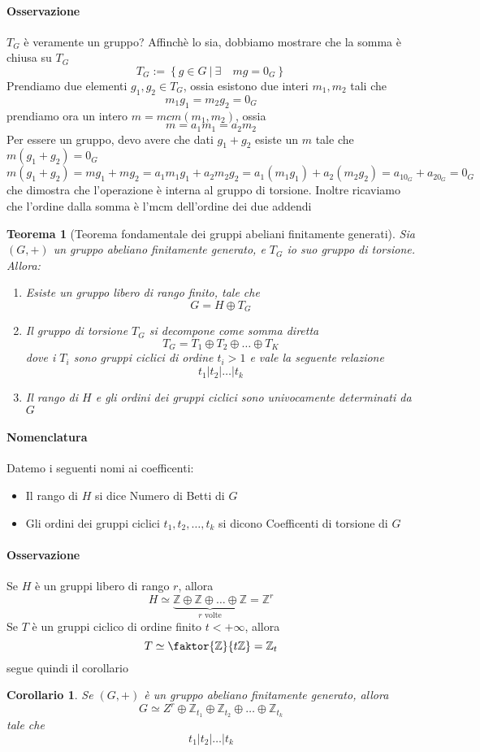 \documentclass[a4paper]{report}
\newtheorem{theorem}{Teorema}
\newtheorem{corollary}{Corollario}
\newcommand{\Z}{\ensuremath{\mathbb{Z}}}
\newcommand{\setst}[2]{\ensuremath{\left\{{#1}\ |\ {#2}\right\}}}
\begin{document}
\paragraph{Osservazione} $T_G$ è veramente un gruppo? Affinchè lo sia, dobbiamo mostrare che la somma è chiusa su $T_G$
\[
    T_G:=\setst{g\in G}{\exists\quad mg=0_G}
\]
Prendiamo due elementi $g_1,g_2\in T_G$, ossia esistono due interi $m_1,m_2$ tali che
\[
    m_1g_1=m_2g_2=0_G
\]
prendiamo ora un intero $m=mcm(m_1,m_2)$, ossia
\[
    m=a_1m_1=a_2m_2
\]
Per essere un gruppo, devo avere che dati $g_1+g_2$ esiste un $m$ tale che $m(g_1+g_2)=0_G$
\[
    m(g_1+g_2)=mg_1+mg_2=a_1m_1g_1+a_2m_2g_2=a_1(m_1g_1)+a_2(m_2g_2)=a_10_G+a_20_G=0_G
\]
che dimostra che l'operazione è interna al gruppo di torsione. Inoltre ricaviamo che l'ordine dalla somma è l'mcm dell'ordine dei due addendi
\begin{theorem}[Teorema fondamentale dei gruppi abeliani finitamente generati]
    Sia $(G,+)$ un gruppo abeliano finitamente generato, e $T_G$ io suo gruppo di torsione. Allora:
    \begin{enumerate}
        \item Esiste un gruppo libero di rango finito, tale che
              \[
                  G=H\oplus T_G
              \]
        \item Il gruppo di torsione $T_G$ si decompone come somma diretta
              \[
                  T_G=T_1\oplus T_2\oplus\dots\oplus T_K
              \]
              dove i $T_i$ sono gruppi ciclici di ordine $t_i>1$ e vale la seguente relazione
              \[
                  t_1|t_2|\dots|t_k
              \]
        \item Il rango di $H$ e gli ordini dei gruppi ciclici sono univocamente determinati da $G$
    \end{enumerate}
\end{theorem}
\paragraph{Nomenclatura}
Datemo i seguenti nomi ai coefficenti:
\begin{itemize}
    \item Il rango di $H$ si dice Numero di Betti di $G$
    \item Gli ordini dei gruppi ciclici $t_1,t_2,\dots,t_k$ si dicono Coefficenti di torsione di $G$
\end{itemize}
\paragraph{Osservazione} Se $H$ è un gruppi libero di rango $r$, allora
\[
    H\simeq\underbrace{\Z\oplus\Z\oplus\dots\oplus\Z}_{r\text{ volte}}=\Z^r
\]
Se $T$ è un gruppi ciclico di ordine finito $t<+\infty$, allora
\[
    T\simeq\faktor{\Z}{t\Z}=\Z_t
\]
segue quindi il corollario
\pagebreak
\begin{corollary}
    Se $(G,+)$ è un gruppo abeliano finitamente generato, allora
    \[
        G\simeq Z^r\oplus\Z_{t_1}\oplus\Z_{t_2}\oplus\dots\oplus\Z_{t_k}
    \]
    tale che
    \[
        t_1|t_2|\dots|t_k
    \]
\end{corollary}
\end{document}
